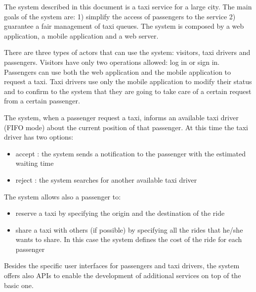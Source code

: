 The system described in this document is a taxi service for a large city.
The main goals of the system are: 1) simplify the access of passengers to the service 2) guarantee a fair management of taxi queues.
The system is composed by a web application, a mobile application and a web server.

There are three types of actors that can use the system: visitors, taxi drivers and passengers.
Visitors have only two operations allowed: log in or sign in.
Passengers can use both the web application and the mobile application to request a taxi.
Taxi drivers use only the mobile application to modify their status and to confirm to the system that they are going to take care of a certain request from a certain passenger.

The system, when a passenger request a taxi, informs an available taxi driver (FIFO mode) about the current position of that passenger. 
At this time the taxi driver has two options:
\begin{itemize}
\item accept : the system sends a notification to the passenger with the estimated waiting time
\item reject : the system searches for another available taxi driver
\end{itemize}

The system allows also a passenger to:
\begin{itemize}
\item reserve a taxi by specifying the origin and the destination of the ride
\item share a taxi with others (if possible) by specifying all the rides that he/she wants to share. In this case the system defines the cost of the ride for each passenger
\end{itemize}

Besides the specific user interfaces for passengers and taxi drivers, the system offers also APIs to enable the development of additional services on top of the basic one.